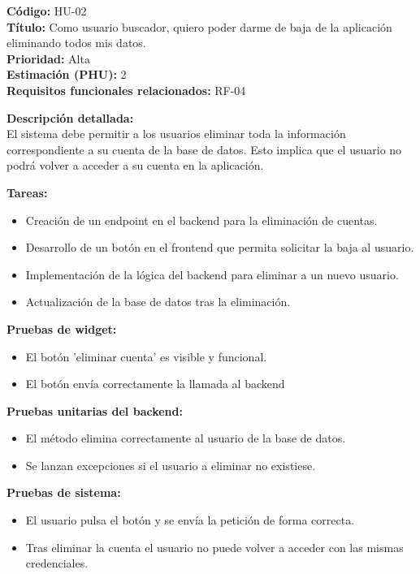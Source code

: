 \begin{tarjetaHU}
\textbf{Código:} HU-02 \\
\textbf{Título:} Como usuario buscador, quiero poder darme de baja de la aplicación eliminando todos mis datos. \\
\textbf{Prioridad:} Alta \\
\textbf{Estimación (PHU):} 2 \\
\textbf{Requisitos funcionales relacionados:} RF-04

\vspace{0.5em}
\textbf{Descripción detallada:} \\
El sistema debe permitir a los usuarios eliminar toda la información correspondiente a su cuenta de la base de datos. Esto implica que el usuario no podrá volver a acceder a su cuenta en la aplicación.

\vspace{0.5em}
\textbf{Tareas:}
\begin{itemize}[left=0pt]
  \item Creación de un endpoint en el backend para la eliminación de cuentas.
  \item Desarrollo de un botón en el frontend que permita solicitar la baja al usuario.
  \item Implementación de la lógica del backend para eliminar a un nuevo usuario.
  \item Actualización de la base de datos tras la eliminación.
\end{itemize}

\vspace{0.5em}
\textbf{Pruebas de widget:}
\begin{itemize}[left=0pt]
  \item El botón 'eliminar cuenta' es visible y funcional.
  \item El botón envía correctamente la llamada al backend
\end{itemize}
\textbf{Pruebas unitarias del backend:}
\begin{itemize}[left=0pt]
  \item El método elimina correctamente al usuario de la base de datos.
  \item Se lanzan excepciones si el usuario a eliminar no existiese.
\end{itemize}
\textbf{Pruebas de sistema:}
\begin{itemize}[left=0pt]
  \item El usuario pulsa el botón y se envía la petición de forma correcta.
  \item Tras eliminar la cuenta el usuario no puede volver a acceder con las mismas credenciales.
\end{itemize}

\end{tarjetaHU}


